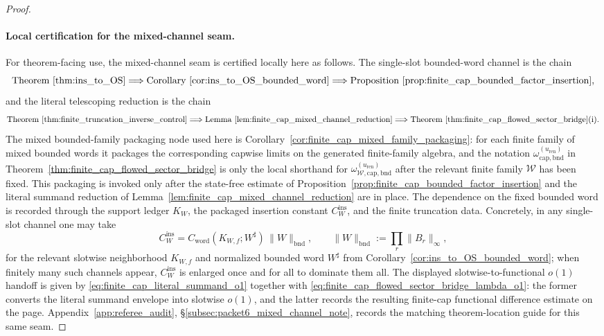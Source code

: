 \begin{proof}
\paragraph*{Local certification for the mixed-channel seam.}
\label{par:finite_cap_mixed_channel_certification}
For theorem-facing use, the mixed-channel seam is certified locally here as follows.
The single-slot bounded-word channel is the chain
\[
\text{Theorem~\ref{thm:ins_to_OS}}
\Longrightarrow
\text{Corollary~\ref{cor:ins_to_OS_bounded_word}}
\Longrightarrow
\text{Proposition~\ref{prop:finite_cap_bounded_factor_insertion}},
\]
and the literal telescoping reduction is the chain
\[
\text{Theorem~\ref{thm:finite_truncation_inverse_control}}
\Longrightarrow
\text{Lemma~\ref{lem:finite_cap_mixed_channel_reduction}}
\Longrightarrow
\text{Theorem~\ref{thm:finite_cap_flowed_sector_bridge}(i)}.
\]
The mixed bounded-family packaging node used here is Corollary~\ref{cor:finite_cap_mixed_family_packaging}: for each finite family of mixed bounded words it packages the corresponding capwise limits on the generated finite-family algebra, and the notation
\(
\omega_{\mathrm{cap,bnd}}^{(u_{\mathrm{ren}})}
\)
in Theorem~\ref{thm:finite_cap_flowed_sector_bridge} is only the local shorthand for
\(
\omega_{\mathcal W,\mathrm{cap,bnd}}^{(u_{\mathrm{ren}})}
\)
after the relevant finite family $\mathcal W$ has been fixed.
This packaging is invoked only after the state-free estimate of Proposition~\ref{prop:finite_cap_bounded_factor_insertion} and the literal summand reduction of Lemma~\ref{lem:finite_cap_mixed_channel_reduction} are in place.
The dependence on the fixed bounded word is recorded through the support ledger $K_W$, the packaged insertion constant $C_W^{\mathrm{ins}}$, and the finite truncation data.
Concretely, in any single-slot channel one may take
\[
C_W^{\mathrm{ins}}
=
C_{\mathrm{word}}(K_{W,f};W^{\sharp})\,\|W\|_{\mathrm{bnd}},
\qquad
\|W\|_{\mathrm{bnd}}:=\prod_r \|B_r\|_\infty,
\]
for the relevant slotwise neighborhood $K_{W,f}$ and normalized bounded word $W^{\sharp}$ from Corollary~\ref{cor:ins_to_OS_bounded_word}; when finitely many such channels appear, $C_W^{\mathrm{ins}}$ is enlarged once and for all to dominate them all.
The displayed slotwise-to-functional $o(1)$ handoff is given by
\eqref{eq:finite_cap_literal_summand_o1} together with
\eqref{eq:finite_cap_flowed_sector_bridge_lambda_o1}: the former converts the literal summand envelope into slotwise $o(1)$, and the latter records the resulting finite-cap functional difference estimate on the page.
Appendix~\ref{app:referee_audit}, \S\ref{subsec:packet6_mixed_channel_note}, records the matching theorem-location guide for this same seam.


\end{proof}
